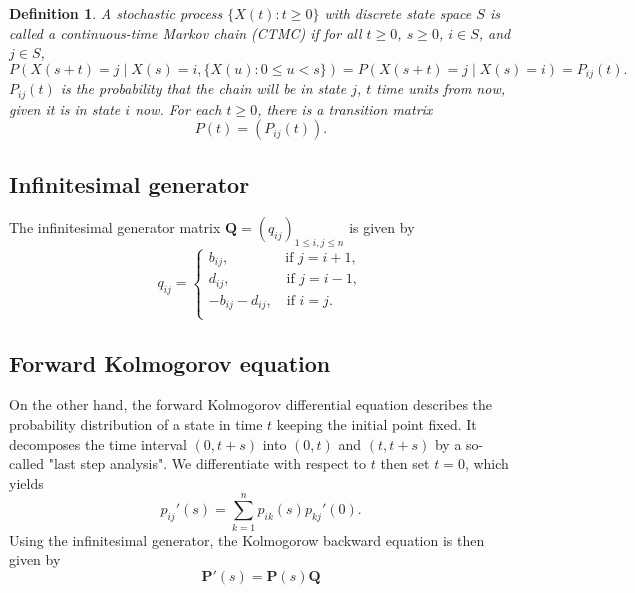 \documentclass[12pt,a4paper]{article}
\newtheorem{definition}{Definition}
\begin{document}
\begin{definition}
	A stochastic process $\{ X(t) : t \geq 0 \}$ with discrete state space $S$ is called a continuous-time Markov chain (CTMC) if for all $t \geq 0$, $s \geq 0$, $i \in S$, and $j \in S$,
	$$
	P(X(s + t) = j \mid X(s) = i, \{ X(u) : 0 \leq u < s \}) = P(X(s + t) = j \mid X(s) = i) = P_{ij}(t).
	$$
	$P_{ij}(t)$ is the probability that the chain will be in state $j$, $t$ time units from now, given it is in state $i$ now.
	For each $t \geq 0$, there is a transition matrix
	$$
	P(t) = (P_{ij}(t)).
	$$
\end{definition}



\subsection{Infinitesimal generator}
The infinitesimal generator matrix $\bm Q = (q_{ij})_{1\leq i,j\leq n}$ is given by
\begin{equation}
	q_{ij} = 
	\begin{cases}
		b_{ij},\qquad\qquad	\text{if } j=i+1,\\
		d_{ij},	\qquad\qquad \text{if }  j=i-1,\\
		-b_{ij}-d_{ij}, \quad	\text{if } i=j.	\\
	\end{cases}	
\end{equation}


\subsection{Forward Kolmogorov equation}
On the other hand, the forward Kolmogorov differential equation describes the probability distribution of a state
in time $t$ keeping the initial point fixed. 
It decomposes the time interval $(0,t+s)$ into $(0,t)$ and $(t, t+s)$ by a so-called "last step analysis". 
We differentiate with respect to $t$ then set $t=0$, which yields
\begin{equation}
	p_{ij}'(s) = \sum_{k=1}^n p_{ik}(s)p_{kj}'(0).
\end{equation}
Using the infinitesimal generator, the Kolmogorow backward equation is then given by
\begin{equation}
	\bm P'(s) = \bm P(s)\bm Q 
\end{equation}
\end{document}

